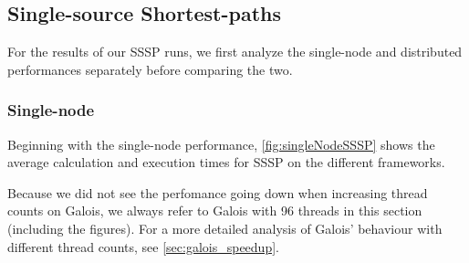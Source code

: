 

\subsection{Single-source Shortest-paths}
For the results of our SSSP runs, we first analyze the single-node and distributed performances separately before comparing the two.

\subsubsection{Single-node}
Beginning with the single-node performance, \autoref{fig:singleNodeSSSP} shows the average calculation and execution times for SSSP on the different frameworks.

Because we did not see the perfomance going down when increasing thread counts on Galois, we always refer to Galois with 96 threads in this section (including the figures).
For a more detailed analysis of Galois' behaviour with different thread counts, see \autoref{sec:galois_speedup}.





